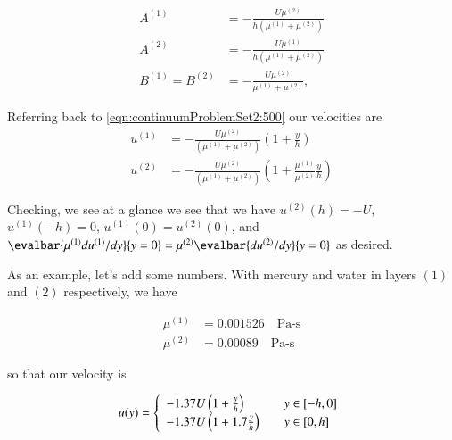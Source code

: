 \begin{align}\label{eqn:continuumProblemSet2:580}
A^{(1)} &= -\frac{U \mu^{(2)}}{h(\mu^{(1)} + \mu^{(2)})} \\
A^{(2)} &= -\frac{U \mu^{(1)}}{h(\mu^{(1)} + \mu^{(2)})} \\
B^{(1)} = B^{(2)} &= -\frac{U \mu^{(2)}}{\mu^{(1)} + \mu^{(2)}},
\end{align}

Referring back to \ref{eqn:continuumProblemSet2:500} our velocities are
\begin{equation}\label{eqn:continuumProblemSet2:600}
\boxed{
\begin{aligned}
u^{(1)} &= 
-\frac{U \mu^{(2)} }{(\mu^{(1)} + \mu^{(2)})} \left( 1 + \frac{y}{h} \right) \\
u^{(2)} &= 
-\frac{U \mu^{(2)} }{(\mu^{(1)} + \mu^{(2)})} \left( 1 + \frac{\mu^{(1)}}{\mu^{(2)}} \frac{y}{h} \right) 
\end{aligned}
}
\end{equation}

Checking, we see at a glance we see that we have $u^{(2)}(h) = -U$, $u^{(1)}(-h) = 0$, $u^{(1)}(0) = u^{(2)}(0)$, and $\evalbar{\mu^{(1)} du^{(1)}/dy}{y=0} = \mu^{(2)} \evalbar{du^{(2)}/dy}{y=0}$ as desired.

As an example, let's add some numbers.  With mercury and water in layers ${(1)}$ and ${(2)}$ respectively, we have

\begin{align}\label{eqn:continuumL16:620}
\mu^{(1)} &= 0.001526 \quad \text{Pa-s} \\
\mu^{(2)} &= 0.00089 \quad \text{Pa-s} 
\end{align}

so that our velocity is

\begin{equation}\label{eqn:continuumProblemSet2:640}
u(y) = 
\left\{
\begin{array}{l l}
-1.37 U \left(1 + \frac{y}{h}\right) & \quad \mbox{$y \in [-h, 0]$} \\
-1.37 U \left(1 + 1.7 \frac{y}{h}\right) & \quad \mbox{$y \in [0, h]$}
\end{array}
\right.
\end{equation}

